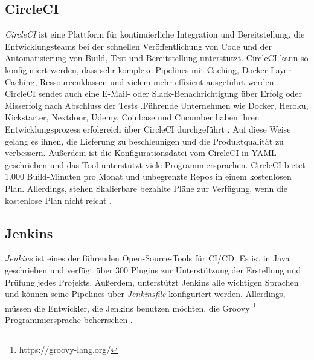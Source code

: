 \subsection{CircleCI}

\textit{CircleCI} ist eine Plattform für kontinuierliche Integration und Bereitstellung, die Entwicklungsteams bei der schnellen Veröffentlichung von Code und der Automatisierung von Build, Test und Bereitstellung unterstützt. CircleCI kann so konfiguriert werden, dass sehr komplexe Pipelines mit Caching, Docker Layer Caching, Ressourcenklassen und vielem mehr effizient ausgeführt werden \cite{CircleCI:homepage}.
CircleCI sendet auch eine E-Mail- oder Slack-Benachrichtigung über Erfolg oder Misserfolg nach Abschluss der Tests \cite{CircleCI:notifications}.Führende Unternehmen wie Docker, Heroku, Kickstarter, Nextdoor, Udemy, Coinbase und Cucumber haben ihren Entwicklungsprozess erfolgreich über CircleCI durchgeführt \cite{CircleCI:customers}. Auf diese Weise gelang es ihnen, die Lieferung zu beschleunigen und die Produktqualität zu verbessern. Außerdem ist die Konfigurationsdatei vom CircleCI in YAML geschrieben und das Tool unterstützt viele Programmiersprachen. CircleCI bietet 1.000 Build-Minuten pro Monat und unbegrenzte Repos in einem kostenlosen Plan. Allerdings, stehen Skalierbare bezahlte Pläne zur Verfügung, wenn die kostenlose Plan nicht reicht \cite{CircleCI:pricing}.

\subsection{Jenkins}

\textit{Jenkins} ist eines der führenden Open-Source-Tools für CI/CD. Es ist in Java geschrieben und verfügt über 300 Plugins zur Unterstützung der Erstellung und Prüfung jedes Projekts. Außerdem, unterstützt Jenkins alle wichtigen Sprachen und können seine Pipelines über \textit{Jenkinsfile} konfiguriert werden. Allerdings, müssen die Entwickler, die Jenkins benutzen möchten, die Groovy \footnote{https://groovy-lang.org/} Programmiersprache beherrschen \cite{Jenkins:pipeline}.
